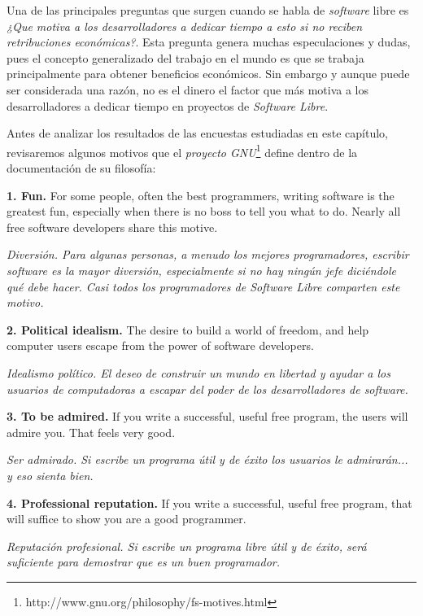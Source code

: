 Una de las principales preguntas que surgen cuando se habla de \textit{software} libre es \textit{¿Que motiva a los desarrolladores a dedicar tiempo a esto si no reciben retribuciones económicas?}. Esta pregunta genera muchas especulaciones y dudas, pues el concepto generalizado del trabajo en el mundo es que se trabaja principalmente para obtener beneficios económicos. Sin embargo y aunque puede ser considerada una razón, no es el dinero el factor que más motiva a los desarrolladores a dedicar tiempo en proyectos de \textit{Software Libre}.

Antes de analizar los resultados de  las encuestas estudiadas en este capítulo, revisaremos algunos motivos que el \textit{proyecto GNU}\footnote{ http://www.gnu.org/philosophy/fs-motives.html } define dentro de la documentación de su filosofía:

{\bf 1. Fun.} For some people, often the best programmers, writing software is the greatest fun, especially when there is no boss to tell you what to do. Nearly all free software developers share this motive.

\textit{Diversión. Para algunas personas, a menudo los mejores programadores, escribir software es la mayor diversión, especialmente si no hay ningún jefe diciéndole qué debe hacer. Casi todos los programadores de \textit{Software Libre} comparten este motivo.}\vspace{0.4cm} 

{\bf 2. Political idealism.} The desire to build a world of freedom, and help computer users escape from the power of software developers.

\textit{Idealismo político. El deseo de construir un mundo en libertad y ayudar a los usuarios de computadoras a escapar del poder de los desarrolladores de software.}\vspace{0.4cm} 

{\bf 3. To be admired.} If you write a successful, useful free program, the users will admire you. That feels very good.

\textit{Ser admirado. Si escribe un programa útil y de éxito los usuarios le admirarán... y eso sienta bien.}\vspace{0.4cm} 

{\bf 4. Professional reputation.} If you write a successful, useful free program, that will suffice to show you are a good programmer.

\textit{Reputación profesional. Si escribe un programa libre útil y de éxito, será suficiente para demostrar que es un buen programador.}\vspace{0.4cm} 


